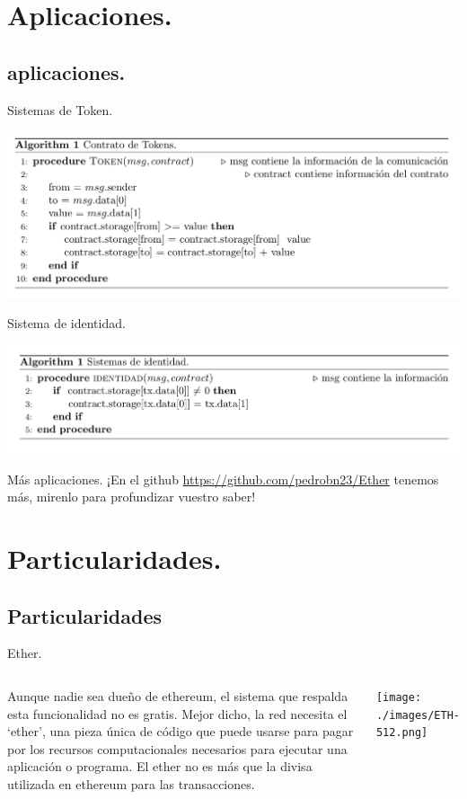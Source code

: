 \documentclass[usenames,dvipsnames]{beamer}
\begin{document}
\section { Aplicaciones. }
\subsection{aplicaciones. }

\begin{frame}{ Sistemas de Token. }
	
\includegraphics[width=\textwidth]{./images/alg1.png}
\end{frame}
\begin{frame}{ Sistema de identidad. }

\includegraphics[width=\textwidth]{./images/alg2.png}
\end{frame}
\begin{frame}{ Más aplicaciones. }
	¡En el github \url{https://github.com/pedrobn23/Ether} tenemos más, mirenlo para profundizar vuestro saber!
\end{frame}

\section{ Particularidades. }
\subsection{Particularidades}

\begin{frame}{ Ether. }

	\begin{columns}
Aunque nadie sea dueño de ethereum, el sistema que respalda esta funcionalidad no es gratis. Mejor dicho, la red necesita el ‘ether’, una pieza única de código que puede usarse para pagar por los recursos computacionales necesarios para ejecutar una aplicación o programa. El ether no es más que la divisa utilizada en ethereum para las transacciones.

   
\texttt{[image: ./images/ETH-512.png]}

\end{columns}

\end{frame}
\end{document}
